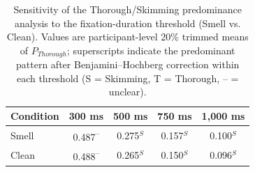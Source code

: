 \begin{table}[ht]
\centering
\caption{Sensitivity of the Thorough/Skimming predominance analysis to the
fixation-duration threshold (Smell vs. Clean). Values are participant-level 20\% trimmed
means of $P_{Thorough}$; superscripts indicate the predominant pattern
after Benjamini--Hochberg correction within each threshold
(S = Skimming, T = Thorough, -- = unclear).}
\label{tab:thorough_threshold_sensitivity_smell_clean}
\begin{tabular}{lcccc}
\toprule
Condition & 300 ms & 500 ms & 750 ms & 1,000 ms \\
\midrule
Smell     & 0.487\textsuperscript{--} & 0.275$^{S}$ & 0.157$^{S}$ & 0.100$^{S}$ \\
Clean     & 0.488\textsuperscript{--} & 0.265$^{S}$ & 0.150$^{S}$ & 0.096$^{S}$ \\
\bottomrule
\end{tabular}
\end{table}
